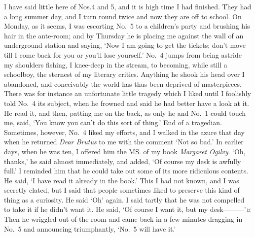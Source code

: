I have said little here of Nos.\@ 4 and 5, and it is high time I had finished.
They had a long summer day, and I turn round twice and now they are off to school.
On Monday, as it seems,
I was escorting No.~5 to a children’s party and brushing his hair in the ante‐room;
and by Thursday he is placing me against the wall of an underground station and saying,
‘Now I am going to get the tickets;
don’t move till I come back for you or you’ll lose yourself.’
No.~4 jumps from being astride my shoulders fishing, I knee‐deep in the stream,
to becoming, while still a schoolboy, the sternest of my literary critics.
Anything he shook his head over I abandoned,
and conceivably the world has thus been deprived of masterpieces.
There was for instance an unfortunate little tragedy which I liked
until I foolishly told No.~4 its subject,
when he frowned and said he had better have a look at it.
He read it, and then, patting me on the back, as only he and No.~1 could touch me, said,
‘You know you can’t do this sort of thing.’
End of a tragedian.
Sometimes, however, No.~4 liked my efforts,
and I walked in the azure that day when he returned \emph{Dear Brutus} to me
with the comment ‘Not so bad.’
In earlier days, when he was ten, I offered him the MS. of my book \emph{Margaret Ogilvy}.
‘Oh, thanks,’ he said almost immediately, and added, ‘Of course my desk is awfully full.’
I reminded him that he could take out some of its more ridiculous contents.
He said, ‘I have read it already in the book.’
This I had not known, and I was secretly elated,
but I said that people sometimes liked to preserve this kind of thing as a curiosity.
He said ‘Oh’ again.
I said tartly that he was not compelled to take it if he didn’t want it.
He said, ‘Of course I want it, but my desk———’¤
Then he wriggled out of the room and came back in a few minutes
dragging in No.~5 and announcing triumphantly, ‘No.~5 will have it.’

